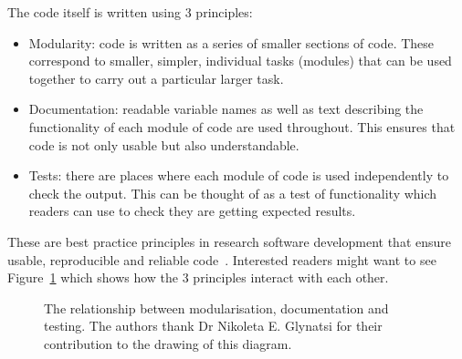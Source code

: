 The code itself is written using 3 principles:

\begin{itemize}
        \item Modularity: code is written as a
              series of smaller sections of code. These correspond to smaller,
              simpler, individual tasks (modules) that can be used together to carry out
              a particular larger task.
        \item Documentation: readable variable names as
              well as
              text describing the functionality of each module of code are used
              throughout. This ensures that code is not only usable but also
              understandable.
          \item Tests: there are places where each module of code is
              used independently to check the output. This can be thought of as a
              test of functionality which readers can use to check they are
              getting expected results.
\end{itemize}

These are best practice principles in research software development
that ensure usable, reproducible and reliable code~\cite{wilson2014best}.
Interested readers might want to see Figure~\ref{fig:rsd-triangle} which shows
how the 3 principles interact with each other.

\begin{figure}
    \begin{center}
        
        \caption{The relationship between modularisation, documentation and
            testing. The authors thank Dr Nikoleta E. Glynatsi for their contribution to
            the drawing of this diagram.}
        \label{fig:rsd-triangle}
    \end{center}
\end{figure}
